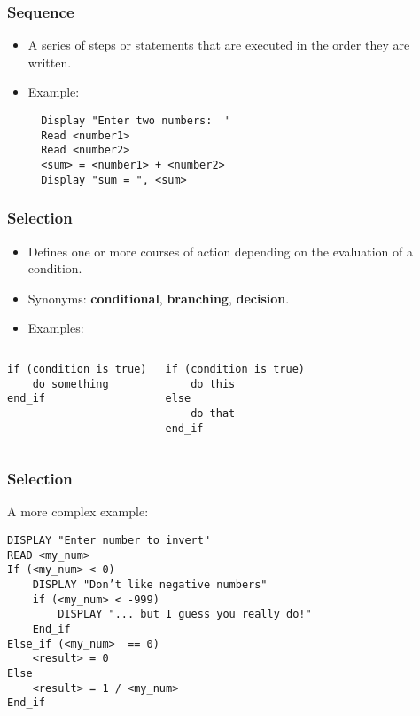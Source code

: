\documentclass[graphics]{beamer}
\begin{document}
\begin{frame}[fragile]\frametitle{Sequence}
    \begin{itemize}
        \item A series of steps or statements that are executed in the order they are written.
        \item Example:
        \begin{verbatim}
  Display "Enter two numbers:  "
  Read <number1>
  Read <number2>
  <sum> = <number1> + <number2>
  Display "sum = ", <sum>
        \end{verbatim}
    \end{itemize}
\end{frame}

\begin{frame}[fragile]\frametitle{Selection}
    \begin{itemize}
        \item Defines one or more courses of action depending on the evaluation of a condition.
        \item Synonyms: \textbf{conditional}, \textbf{branching}, \textbf{decision}.
        \item Examples:
    \end{itemize}
    \begin{columns}
            \begin{verbatim}
if (condition is true)
    do something
end_if


            \end{verbatim}
            \begin{verbatim}
if (condition is true)
    do this
else
    do that
end_if
            \end{verbatim}
    \end{columns}
\end{frame}

\begin{frame}[fragile]\frametitle{Selection}
    A more complex example:
    \begin{verbatim}
DISPLAY "Enter number to invert"
READ <my_num>
If (<my_num> < 0)
    DISPLAY "Don’t like negative numbers"
    if (<my_num> < -999)
        DISPLAY "... but I guess you really do!"
    End_if
Else_if (<my_num>  == 0)
    <result> = 0
Else
    <result> = 1 / <my_num>
End_if
    \end{verbatim}
\end{frame}
\end{document}
